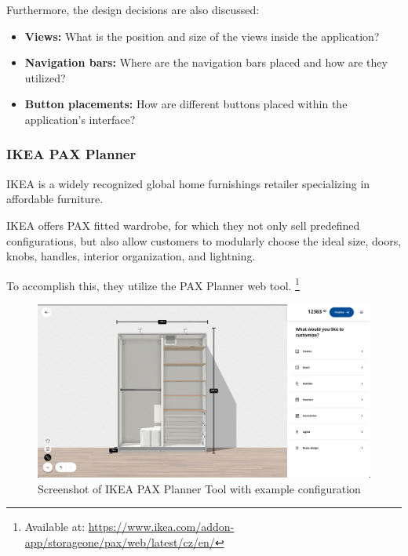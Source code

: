 \noindent Furthermore, the design decisions are also discussed:\nopagebreak
\begin{itemize}[label=\rectanglebullet]
    \item \textbf{Views:} What is the position and size of the views inside the application?
    \item \textbf{Navigation bars:} Where are the navigation bars placed and how are they utilized?
    \item \textbf{Button placements:} How are different buttons placed within the application's interface?
\end{itemize}


\subsubsection{IKEA PAX Planner}

IKEA is a widely recognized global home furnishings retailer specializing in affordable furniture. \cite{StatistaIkea}

IKEA offers PAX fitted wardrobe, for which they not only sell predefined configurations, but also allow customers to modularly choose the ideal size, doors, knobs, handles, interior organization, and lightning.

To accomplish this, they utilize the PAX Planner web tool. \footnote{Available at: \url{https://www.ikea.com/addon-app/storageone/pax/web/latest/cz/en/}} 

\begin{figure}[h]
\centering
\includegraphics[width=\textwidth]{images/analysis_ikea-pax.png}
\caption{Screenshot of IKEA PAX Planner Tool with example configuration}
\end{figure}

